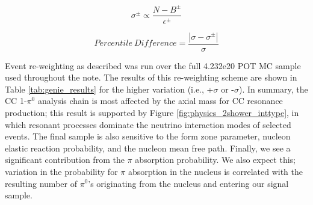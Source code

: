 \begin{equation} \label{eq:genie_xsec_var}
  \sigma^\pm \propto \frac{N - B^\pm}{\epsilon^\pm} 
\end{equation}

\begin{equation} \label{eq:genie_xsec_percentdiff}
  Percentile\ Difference = \frac{| \sigma - \sigma^\pm |}{\sigma} 
\end{equation}

\par Event re-weighting as described was run over the full 4.232e20 POT MC sample used throughout the note. The results of this re-weighting scheme are shown in Table \ref{tab:genie_results} for the higher variation (i.e., +$\sigma$ or -$\sigma$). In summary, the CC 1-$\pi^0$ analysis chain is most affected by the axial mass for CC resonance production;  this result is supported by Figure \ref{fig:physics_2shower_inttype}, in which resonant processes dominate the neutrino interaction modes of selected events. The final sample is also sensitive to the form zone parameter, nucleon elastic reaction probability, and the nucleon mean free path.   Finally, we see a significant contribution from the $\pi$ absorption probability. We also expect this; variation in the probability for $\pi$ absorption in the nucleus is correlated with the resulting number of $\pi^0$'s originating from the nucleus and entering our signal sample.  



